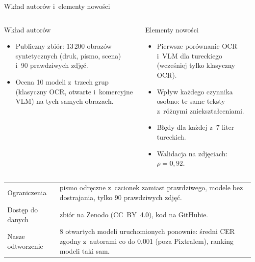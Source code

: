 \documentclass[aspectratio=169,11pt]{beamer}
\newenvironment{rowna}[1]{\vspace*{-0.5\baselineskip}\begin{minipage}[t][#1][t]{\linewidth}\vspace{0pt}\raggedright}{\end{minipage}}
\begin{document}
\begin{frame}{Wkład autorów i~elementy nowości}
  \begin{columns}[t]
    \begin{column}{0.48\textwidth}
      \begin{block}{Wkład autorów\vphantom{y}}
        \begin{rowna}{3.3cm}
        \small
        \setlength{\leftmargini}{1.2em}
        \begin{itemize}
          \setlength{\itemsep}{1pt}
          \item Publiczny zbiór: 13\,200 obrazów syntetycznych (druk, pismo, scena) i~90 prawdziwych zdjęć.
          \item Ocena 10 modeli z~trzech grup (klasyczny OCR, otwarte i~komercyjne VLM) na tych samych obrazach.
        \end{itemize}
        \end{rowna}
      \end{block}
    \end{column}
    \begin{column}{0.48\textwidth}
      \begin{block}{Elementy nowości}
        \begin{rowna}{3.3cm}
        \small
        \setlength{\leftmargini}{1.2em}
        \begin{itemize}
          \setlength{\itemsep}{1pt}
          \item Pierwsze porównanie OCR i~VLM dla tureckiego (wcześniej tylko klasyczny OCR).
          \item Wpływ każdego czynnika osobno: te same teksty z~różnymi zniekształceniami.
          \item Błędy dla każdej z~7 liter tureckich.
          \item Walidacja na zdjęciach: $\rho=0{,}92$.
        \end{itemize}
        \end{rowna}
      \end{block}
    \end{column}
  \end{columns}
  \vspace{8pt}
  \small
  \begin{tabular}{@{}L{3.0cm}P{\dimexpr\textwidth-3.0cm-2\tabcolsep\relax}@{}}
    Ograniczenia & pismo odręczne z~czcionek zamiast prawdziwego, modele bez dostrajania, tylko 90 prawdziwych zdjęć. \\[2pt]
    Dostęp do danych & zbiór na Zenodo (CC~BY~4.0), kod na GitHubie. \\[2pt]
    Nasze odtworzenie & 8 otwartych modeli uruchomionych ponownie: średni CER zgodny z~autorami co do 0,001 (poza Pixtralem), ranking modeli taki sam.
  \end{tabular}
\end{frame}
\end{document}
